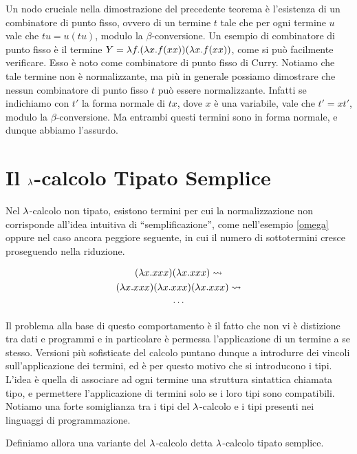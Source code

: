\documentclass[]{marticle}
\begin{document}
Un nodo cruciale nella dimostrazione del precedente teorema \`e l'esistenza di
un combinatore di punto fisso, ovvero di un termine $t$ tale che per ogni
termine $u$ vale che $tu = u(tu)$, modulo la $\beta$-conversione. Un esempio di
combinatore di punto fisso \`e il termine $Y = \lambda f. (\lambda x. f(xx))(\lambda x.
f(xx))$, come si pu\`o facilmente verificare. Esso \`e noto come combinatore di
punto fisso di Curry. Notiamo che tale termine non \`e normalizzante, ma pi\`u
in generale possiamo dimostrare che nessun combinatore di punto fisso $t$ pu\`o
essere normalizzante.  Infatti se indichiamo con $t'$ la forma normale di $tx$,
dove $x$ \`e una variabile, vale che $t' = xt'$, modulo la $\beta$-conversione.
Ma entrambi questi termini sono in forma normale, e dunque abbiamo l'assurdo.

\section{Il $\lambda$-calcolo Tipato Semplice}

Nel $\lambda$-calcolo non tipato, esistono termini per cui la normalizzazione non
corrisponde all'idea intuitiva di ``semplificazione'', come nell'esempio
\ref{omega} oppure nel caso ancora peggiore seguente, in cui il numero di
sottotermini cresce proseguendo nella riduzione.

\begin{block}[Esempio]
    \begin{gather*}
        (\lambda x. xxx)(\lambda x. xxx) \rightsquigarrow \\
        (\lambda x. xxx)(\lambda x. xxx)(\lambda x. xxx)\rightsquigarrow \\
        \cdots
    \end{gather*}
\end{block} 

Il problema alla base di questo comportamento \`e il fatto che non vi \`e
distizione tra dati e programmi e in particolare \`e permessa l'applicazione di
un termine a se stesso. Versioni pi\`u sofisticate del calcolo puntano dunque a
introdurre dei vincoli sull'applicazione dei termini, ed \`e per questo motivo
che si introducono i tipi. L'idea \`e quella di associare ad ogni termine una
struttura sintattica chiamata tipo, e permettere l'applicazione di termini solo
se i loro tipi sono compatibili. Notiamo una forte somiglianza tra i tipi del
$\lambda$-calcolo e i tipi presenti nei linguaggi di programmazione.

Definiamo allora una variante del $\lambda$-calcolo detta $\lambda$-calcolo tipato
semplice.
\end{document}

